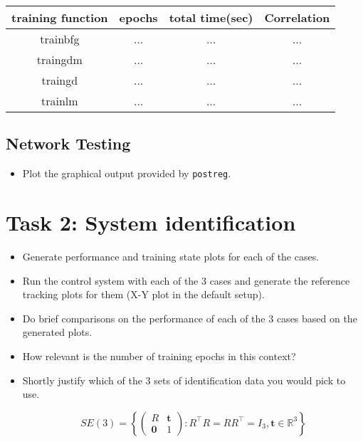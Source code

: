 \documentclass[a4paper,12pt]{article}
\begin{document}
\begin{center}
	\begin{tabular}{|c | c | c | c|} 
		\hline
		training function & epochs & total time(sec) & Correlation \\ [0.5ex] 
		\hline
		trainbfg & ... & ...  & ... \\ 
		\hline
		traingdm & ... & ... & ... \\
		\hline
		traingd & ... & ... & ... \\
		\hline
		trainlm & ... & ... & ... \\
		\hline
	\end{tabular}
\end{center}

\subsection{Network Testing}

\begin{itemize}
	
	\item Plot the graphical output provided by \texttt{postreg}.

\end{itemize}


\section{Task 2: System identification}

\begin{itemize}

	\item Generate performance and training state plots for each of the cases.


	\item Run the control system with each of the 3 cases and generate the reference tracking plots for them (X-Y plot in the default setup).

	\item Do brief comparisons on the performance of each of the 3 cases based on the generated plots.

	\item How relevant is the number of training epochs in this context?

	\item Shortly justify which of the 3 sets of identification data you would pick to use.

	\begin{equation}
	SE(3) = \left\{
	\begin{pmatrix}
	R & \mathbf{t} \\ \mathbf{0} & 1
	\end{pmatrix}
	:
	R^\top R = R R^\top = I_3, \mathbf{t}\in\mathbb{R}^3
	\right\}
	\end{equation}
	
\end{itemize}
\end{document}
